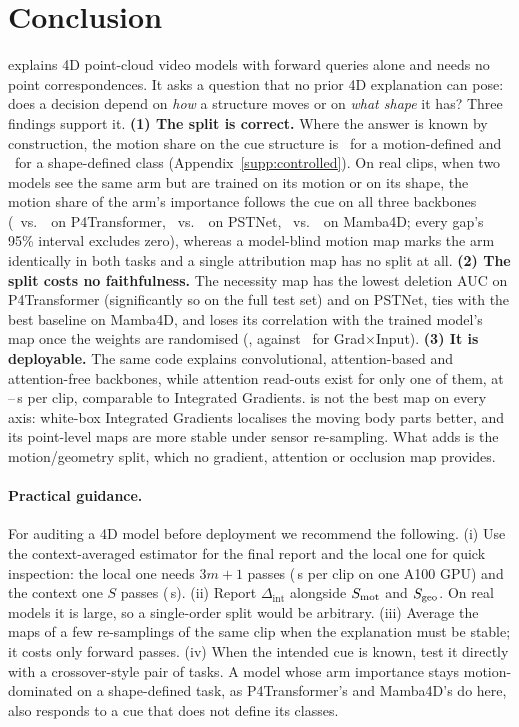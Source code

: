 \section{Conclusion}
\label{sec:conclusion}

\method explains 4D point-cloud video models with forward queries alone and needs no point correspondences. It asks a question that no prior 4D explanation can pose: does a decision depend on \emph{how} a structure moves or on \emph{what shape} it has? Three findings support it.
\textbf{(1) The split is correct.} Where the answer is known by construction, the motion share on the cue structure is \NumCtrlMot\ for a motion-defined and \NumCtrlShape\ for a shape-defined class (Appendix~\ref{supp:controlled}). On real clips, when two models see the same arm but are trained on its motion or on its shape, the motion share of the arm's importance follows the cue on all three backbones (\NumXMotShare\ vs.\ \NumXGeoShare\ on P4Transformer, \NumXPstMotShare\ vs.\ \NumXPstGeoShare\ on PSTNet, \NumXMbaMotShare\ vs.\ \NumXMbaGeoShare\ on Mamba4D; every gap's 95\% interval excludes zero), whereas a model-blind motion map marks the arm identically in both tasks and a single attribution map has no split at all.
\textbf{(2) The split costs no faithfulness.} The necessity map has the lowest deletion AUC on P4Transformer (significantly so on the full test set) and on PSTNet, ties with the best baseline on Mamba4D, and loses its correlation with the trained model's map once the weights are randomised (\NumSanKca, against \NumSanGxI\ for Grad$\times$Input).
\textbf{(3) It is deployable.} The same code explains convolutional, attention-based and attention-free backbones, while attention read-outs exist for only one of them, at \NumPFTKcaTime--\NumPFTKcaCtxTime\,s per clip, comparable to Integrated Gradients.
\method is not the best map on every axis: white-box Integrated Gradients localises the moving body parts better, and its point-level maps are more stable under sensor re-sampling. What \method adds is the motion/geometry split, which no gradient, attention or occlusion map provides.

\paragraph{Practical guidance.}
For auditing a 4D model before deployment we recommend the following. (i) Use the context-averaged estimator for the final report and the local one for quick inspection: the local one needs $3m{+}1$ passes (\NumPFTKcaTime\,s per clip on one A100 GPU) and the context one $S$ passes (\NumPFTKcaCtxTime\,s). (ii) Report $\Delta_{\mathrm{int}}$ alongside $S_{\mathrm{mot}}$ and $S_{\mathrm{geo}}$. On real models it is large, so a single-order split would be arbitrary. (iii) Average the maps of a few re-samplings of the same clip when the explanation must be stable; it costs only forward passes. (iv) When the intended cue is known, test it directly with a crossover-style pair of tasks. A model whose arm importance stays motion-dominated on a shape-defined task, as P4Transformer's and Mamba4D's do here, also responds to a cue that does not define its classes.

